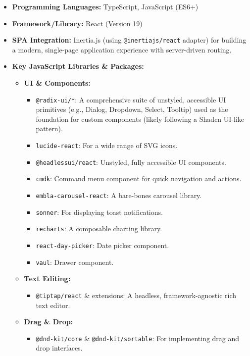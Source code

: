 \documentclass[12pt,a4paper]{article}
\begin{document}
\begin{itemize}
    \item \textbf{Programming Languages:} TypeScript, JavaScript (ES6+)
    \item \textbf{Framework/Library:} React (Version 19)
    \item \textbf{SPA Integration:} Inertia.js (using \texttt{@inertiajs/react} adapter) for building a modern, single-page application experience with server-driven routing.
    \item \textbf{Key JavaScript Libraries \& Packages:}
    \begin{itemize}
        \item \textbf{UI \& Components:}
        \begin{itemize}
            \item \texttt{@radix-ui/*}: A comprehensive suite of unstyled, accessible UI primitives (e.g., Dialog, Dropdown, Select, Tooltip) used as the foundation for custom components (likely following a Shadcn UI-like pattern).
            \item \texttt{lucide-react}: For a wide range of SVG icons.
            \item \texttt{@headlessui/react}: Unstyled, fully accessible UI components.
            \item \texttt{cmdk}: Command menu component for quick navigation and actions.
            \item \texttt{embla-carousel-react}: A bare-bones carousel library.
            \item \texttt{sonner}: For displaying toast notifications.
            \item \texttt{recharts}: A composable charting library.
            \item \texttt{react-day-picker}: Date picker component.
            \item \texttt{vaul}: Drawer component.
        \end{itemize}
        \item \textbf{Text Editing:}
        \begin{itemize}
            \item \texttt{@tiptap/react} \& extensions: A headless, framework-agnostic rich text editor.
        \end{itemize}
        \item \textbf{Drag \& Drop:}
        \begin{itemize}
            \item \texttt{@dnd-kit/core} \& \texttt{@dnd-kit/sortable}: For implementing drag and drop interfaces.

\end{itemize}
\end{itemize}
\end{itemize}
\end{document}
